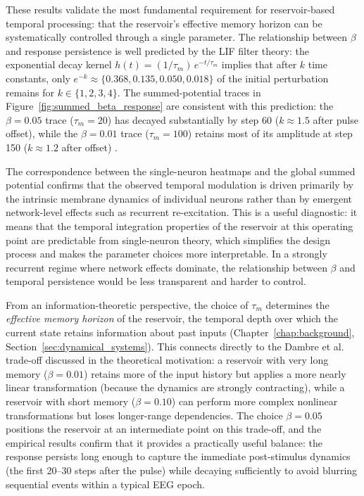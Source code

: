 These results validate the most fundamental requirement for reservoir-based temporal processing: that the reservoir's effective memory horizon can be systematically controlled through a single parameter. The relationship between $\beta$ and response persistence is well predicted by the LIF filter theory: the exponential decay kernel $h(t) = (1/\tau_m)\,e^{-t/\tau_m}$ implies that after $k$ time constants, only $e^{-k} \approx \{0.368, 0.135, 0.050, 0.018\}$ of the initial perturbation remains for $k \in \{1, 2, 3, 4\}$. The summed-potential traces in Figure~\ref{fig:summed_beta_response} are consistent with this prediction: the $\beta = 0.05$ trace ($\tau_m = 20$) has decayed substantially by step 60 ($k \approx 1.5$ after pulse offset), while the $\beta = 0.01$ trace ($\tau_m = 100$) retains most of its amplitude at step 150 ($k \approx 1.2$ after offset) \cite{gerstner_spiking_2002}.

The correspondence between the single-neuron heatmaps and the global summed potential confirms that the observed temporal modulation is driven primarily by the intrinsic membrane dynamics of individual neurons rather than by emergent network-level effects such as recurrent re-excitation. This is a useful diagnostic: it means that the temporal integration properties of the reservoir at this operating point are predictable from single-neuron theory, which simplifies the design process and makes the parameter choices more interpretable. In a strongly recurrent regime where network effects dominate, the relationship between $\beta$ and temporal persistence would be less transparent and harder to control.

From an information-theoretic perspective, the choice of $\tau_m$ determines the \emph{effective memory horizon} of the reservoir, the temporal depth over which the current state retains information about past inputs (Chapter~\ref{chap:background}, Section~\ref{sec:dynamical_systems}). This connects directly to the Dambre et al.\ \cite{dambre_2012} trade-off discussed in the theoretical motivation: a reservoir with very long memory ($\beta = 0.01$) retains more of the input history but applies a more nearly linear transformation (because the dynamics are strongly contracting), while a reservoir with short memory ($\beta = 0.10$) can perform more complex nonlinear transformations but loses longer-range dependencies. The choice $\beta = 0.05$ positions the reservoir at an intermediate point on this trade-off, and the empirical results confirm that it provides a practically useful balance: the response persists long enough to capture the immediate post-stimulus dynamics (the first 20--30 steps after the pulse) while decaying sufficiently to avoid blurring sequential events within a typical EEG epoch.

